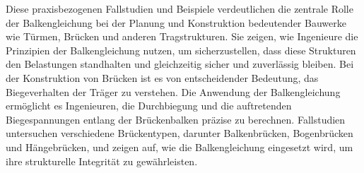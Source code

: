Diese praxisbezogenen Fallstudien und Beispiele verdeutlichen die zentrale Rolle der Balkengleichung bei der Planung und Konstruktion bedeutender Bauwerke wie Türmen, Brücken und anderen Tragstrukturen. 
Sie zeigen, wie Ingenieure die Prinzipien der Balkengleichung nutzen, um sicherzustellen, dass diese Strukturen den Belastungen standhalten und gleichzeitig sicher und zuverlässig bleiben.
Bei der Konstruktion von Brücken ist es von entscheidender Bedeutung, das Biegeverhalten der Träger zu verstehen. 
Die Anwendung der Balkengleichung ermöglicht es Ingenieuren, die Durchbiegung und die auftretenden Biegespannungen entlang der Brückenbalken präzise zu berechnen. Fallstudien untersuchen verschiedene Brückentypen, darunter Balkenbrücken, Bogenbrücken und Hängebrücken, und zeigen auf, wie die Balkengleichung eingesetzt wird, um ihre strukturelle Integrität zu gewährleisten.
